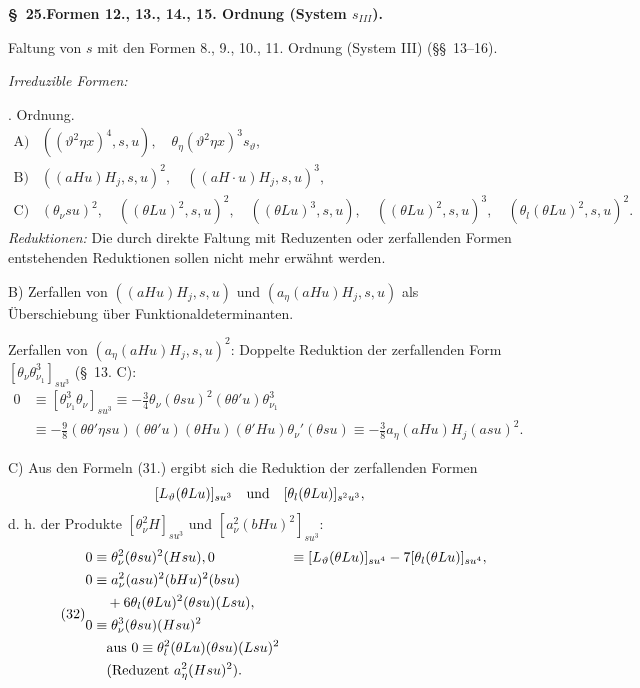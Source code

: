 \documentclass[11pt]{article}
\begin{document}
\begin{center}\textbf{\S\ 25.\quad Formen 12., 13., 14., 15. Ordnung (System $s_{III}$).}\end{center}
Faltung von $s$ mit den Formen 8., 9., 10., 11. Ordnung (System III) (\S\S\ 13--16).

\noindent\emph{Irreduzible Formen:}

. Ordnung.
\[
\begin{array}{rl}
\text{A)}& ((\vartheta^2\eta x)^4,s,u),\quad \theta_\eta(\vartheta^2\eta x)^3s_\vartheta,\\
\text{B)}& ((aHu)H_j,s,u)^2,
\quad ((aH\cdot u)H_j,s,u)^3,\\
\text{C)}& (\theta_\nu su)^2,
\quad ((\theta Lu)^2,s,u)^2,
\quad ((\theta Lu)^3,s,u),
\quad ((\theta Lu)^2,s,u)^3,
\quad (\theta_l(\theta Lu)^2,s,u)^2.
\end{array}
\]
\noindent\emph{Reduktionen:} Die durch direkte Faltung mit Reduzenten oder zerfallenden Formen entstehenden Reduktionen sollen nicht mehr erwähnt werden.

B) Zerfallen von $((aHu)H_j,s,u)$ und $(a_\eta(aHu)H_j,s,u)$ als Überschiebung über Funktionaldeterminanten.

Zerfallen von $(a_\eta(aHu)H_j,s,u)^2$: Doppelte Reduktion der zerfallenden Form $[\theta_\nu\theta_{\nu_1}^3]_{su^3}$ (\S\ 13. C):
\begin{align*}
0&\equiv[\theta_{\nu_1}^3\theta_\nu]_{su^3}
\equiv-\frac34\theta_\nu(\theta su)^2(\theta\theta'u)\theta_{\nu_1}^3\\
&\equiv-\frac98(\theta\theta'\eta su)(\theta\theta'u)(\theta Hu)(\theta'Hu)\theta_\nu'(\theta su)
\equiv-\frac38a_\eta(aHu)H_j(asu)^2.
\end{align*}

C) Aus den Formeln (31.) ergibt sich die Reduktion der zerfallenden Formen
\[
 [L_\vartheta(\theta Lu)]_{su^3}\quad\hbox{und}\quad [\theta_l(\theta Lu)]_{s^2u^3},
\]
d. h. der Produkte $[\theta_\nu^2H]_{su^3}$ und $[a_\nu^2(bHu)^2]_{su^3}$:
\begin{equation}
\tag{32}
\begin{aligned}
0&\equiv\theta_\nu^2(\theta su)^2(Hsu),
0&\equiv [L_\vartheta(\theta Lu)]_{su^4}-7[\theta_l(\theta Lu)]_{su^4},\\
0&\equiv a_\nu^2(asu)^2(bHu)^2(bsu)\\
&\quad+6\theta_l(\theta Lu)^2(\theta su)(Lsu),\\
0&\equiv\theta_\nu^3(\theta su)(Hsu)^2\\
&\quad\hbox{aus }0\equiv\theta_l^2(\theta Lu)(\theta su)(Lsu)^2\\
&\quad(\hbox{Reduzent }a_\eta^2(Hsu)^2).
\end{aligned}
\end{equation}
\end{document}
